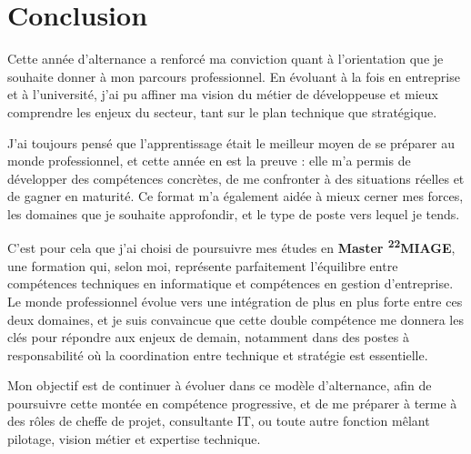 \section{Conclusion}
\label{conclusion}

Cette année d’alternance a renforcé ma conviction quant à l’orientation que je souhaite donner à mon parcours professionnel. En évoluant à la fois en entreprise et à l’université, j’ai pu affiner ma vision du métier de développeuse et mieux comprendre les enjeux du secteur, tant sur le plan technique que stratégique.

J’ai toujours pensé que l’apprentissage était le meilleur moyen de se préparer au monde professionnel, et cette année en est la preuve : elle m’a permis de développer des compétences concrètes, de me confronter à des situations réelles et de gagner en maturité. Ce format m’a également aidée à mieux cerner mes forces, les domaines que je souhaite approfondir, et le type de poste vers lequel je tends.

C’est pour cela que j’ai choisi de poursuivre mes études en \textbf{Master \textsuperscript{22}MIAGE}, une formation qui, selon moi, représente parfaitement l’équilibre entre compétences techniques en informatique et compétences en gestion d’entreprise. Le monde professionnel évolue vers une intégration de plus en plus forte entre ces deux domaines, et je suis convaincue que cette double compétence me donnera les clés pour répondre aux enjeux de demain, notamment dans des postes à responsabilité où la coordination entre technique et stratégie est essentielle.

Mon objectif est de continuer à évoluer dans ce modèle d’alternance, afin de poursuivre cette montée en compétence progressive, et de me préparer à terme à des rôles de cheffe de projet, consultante IT, ou toute autre fonction mêlant pilotage, vision métier et expertise technique.